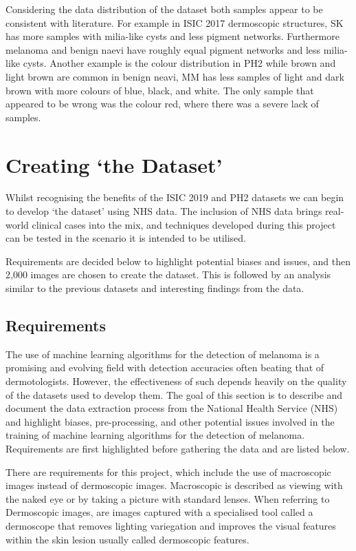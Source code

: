 Considering the data distribution of the dataset both samples appear to be consistent with literature. For example in ISIC 2017 dermoscopic structures, SK has more samples with milia-like cysts and less pigment networks. Furthermore melanoma and benign naevi have roughly equal pigment networks and less milia-like cysts. Another example is the colour distribution in PH2 while brown and light brown are common in benign neavi, MM has less samples of light and dark brown with more colours of blue, black, and white. The only sample that appeared to be wrong was the colour red, where there was a severe lack of samples.


\chapter{Creating `the Dataset'}
Whilst recognising the benefits of the ISIC 2019 and PH2 datasets we can begin to develop `the dataset' using NHS data. The inclusion of NHS data brings real-world clinical cases into the mix, and techniques developed during this project can be tested in the scenario it is intended to be utilised.

Requirements are decided below to highlight potential biases and issues, and then 2,000 images are chosen to create the dataset. This is followed by an analysis similar to the previous datasets and interesting findings from the data.

\section{Requirements}
The use of machine learning algorithms for the detection of melanoma is a promising and evolving field with detection accuracies often beating that of dermotologists\cite{Andre2017}. However, the effectiveness of such depends heavily on the quality of the datasets used to develop them\cite{Tae2019}. The goal of this section is to describe and document the data extraction process from the National Health Service (NHS) and highlight biases, pre-processing, and other potential issues involved in the training of machine learning algorithms for the detection of melanoma. Requirements are first highlighted before gathering the data and are listed below.

There are requirements for this project, which include the use of macroscopic images instead of dermoscopic images. Macroscopic is described as viewing with the naked eye or by taking a picture with standard lenses. When referring to Dermoscopic images, are images captured with a specialised tool called a dermoscope that removes lighting variegation and improves the visual features within the skin lesion usually called dermoscopic features.

